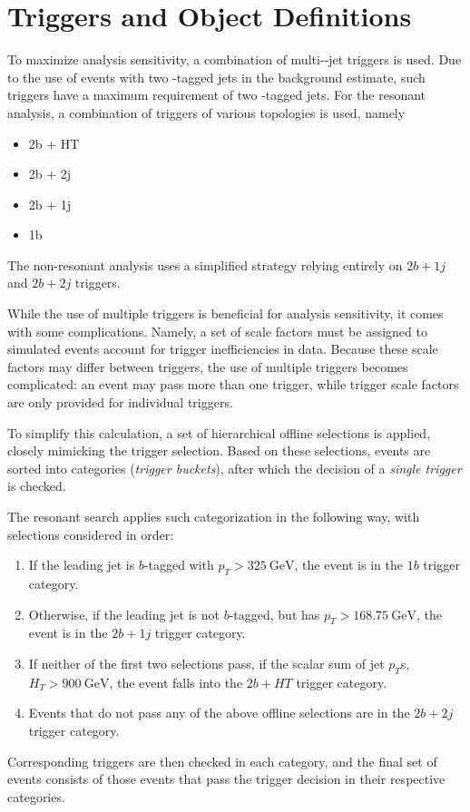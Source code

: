 \section{Triggers and Object Definitions}
\label{sec:trigger}
To maximize analysis sensitivity, a combination of multi-\Pqb-jet triggers is used. Due to the 
use of events with two \Pqb-tagged jets in the background estimate, such triggers have a maximum 
requirement of two \Pqb-tagged jets. For the resonant analysis, a combination of triggers of 
various topologies is used, namely 
\begin{itemize}
	\item 2b + HT
	\item 2b + 2j
	\item 2b + 1j
	\item 1b
\end{itemize}
The non-resonant analysis uses a simplified strategy relying entirely on $2b+1j$ and $2b+2j$
triggers.

While the use of multiple triggers is beneficial for analysis sensitivity, it comes with some
complications. Namely, a set of scale factors must be assigned to simulated events 
account for trigger inefficiencies in data. Because these scale factors may differ between 
triggers, the use of multiple triggers becomes complicated: an event may pass more than one trigger,
while trigger scale factors are only provided for individual triggers.

To simplify this calculation, a set of hierarchical offline selections is applied, closely 
mimicking the trigger selection. Based on these selections, events are sorted into categories
(\emph{trigger buckets}), after which the decision of a \emph{single trigger} is checked. 

The resonant search applies such categorization in the following way, with 
selections considered in order:
\begin{enumerate}
	\item If the leading jet is $b$-tagged with $p_{T} > \SI{325}{\GeV}$, the event is in the $1b$ trigger category.
	\item Otherwise, if the leading jet is not $b$-tagged, but has $p_{T} > \SI{168.75}{\GeV}$, the event is in the $2b+1j$
	trigger category.
	\item If neither of the first two selections pass, if the scalar sum of jet $p_{T}$s, $H_{T} > \SI{900}{\GeV}$,
	the event falls into the $2b+HT$ trigger category.
	\item Events that do not pass any of the above offline selections are in the $2b+2j$ trigger category.
\end{enumerate}
Corresponding triggers are then checked in each category, and the final set of events consists of those events that 
pass the trigger decision in their respective categories. 

